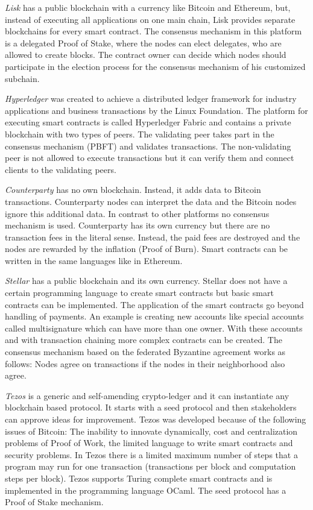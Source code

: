 \documentclass[conference]{IEEEtran}
\begin{document}
\textit{Lisk} has a public blockchain with a currency like Bitcoin and Ethereum, but, instead of executing all applications on one main chain, Lisk provides separate blockchains for every smart contract. The consensus mechanism in this platform is a delegated Proof of Stake, where the nodes can elect delegates, who are allowed to create blocks. The contract owner can decide which nodes should participate in the election process for the consensus mechanism of his customized subchain.  \cite{Bartoletti2017} \par 
\textit{Hyperledger} was created to achieve a distributed ledger framework for industry applications and business transactions by the Linux Foundation. The platform for executing smart contracts is called Hyperledger Fabric and contains a private blockchain with two types of peers. The validating peer takes part in the consensus mechanism (PBFT) and validates transactions. The non-validating peer is not allowed to execute transactions but it can verify them and connect clients to the validating peers. \cite{Cachin2016} \par 
\textit{Counterparty} has no own blockchain. Instead, it adds data to Bitcoin transactions. Counterparty nodes can interpret the data and the Bitcoin nodes ignore this additional data. In contrast to other platforms no consensus mechanism is used. Counterparty has its own currency but there are no transaction fees in the literal sense. Instead, the paid fees are destroyed and the nodes are rewarded by the inflation (Proof of Burn). Smart contracts can be written in the same languages like in Ethereum. \cite{Bartoletti2017} \par 
\textit{Stellar} has a public blockchain and its own currency. Stellar does not have a certain programming language to create smart contracts but basic smart contracts can be implemented. The application of the smart contracts go beyond handling of payments. An example is creating new accounts like special accounts called multisignature which can have more than one owner. With these accounts and with transaction chaining more complex contracts can be created. The consensus mechanism based on the federated Byzantine agreement works as follows: Nodes agree on transactions if the nodes in their neighborhood also agree. \cite{Bartoletti2017} \par 
\textit{Tezos} is a generic and self-amending crypto-ledger and it can instantiate any blockchain based protocol. It starts with a seed protocol and then stakeholders can approve ideas for improvement. Tezos was developed because of the following issues of Bitcoin: The inability to innovate dynamically, cost and centralization problems of Proof of Work, the limited language to write smart contracts and security problems. In Tezos there is a limited maximum number of steps that a program may run for one transaction (transactions per block and computation steps per block). Tezos supports Turing complete smart contracts and is implemented in the programming language OCaml. The seed protocol has a Proof of Stake mechanism. \cite{Goodman2014} \cite{Goodman2014a} \par
\end{document}
